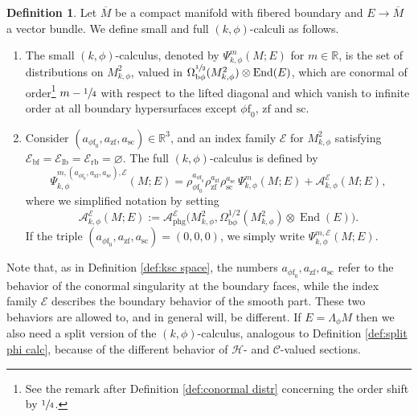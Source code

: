 \documentclass[11pt]{article}
\numberwithin{equation}{section}
\newcommand{\bphi}{{\bb\phi}}
\theoremstyle{plain}
\theoremstyle{definition}
\newtheorem{defn}[Th]{Definition}
\newcommand{\R}{{\mathbb{R}}}
\newcommand\calA{{\mathcal A}}
\newcommand\calE{{\mathcal E}}
\newcommand {\phg}{{\mathrm{phg}}}
\newcommand{\phif}{{\phi\mathrm{f}}}
\newcommand{\lf}{{\mathrm{lb}}}
\newcommand{\rf}{{\mathrm{rb}}}
\newcommand{\bb}{{\mathrm{b}}}
\newcommand{\bbf}{{\mathrm{bf}}}
\newcommand{\ssc}{{\mathrm{sc}}}
\newcommand{\zf}{{\mathrm{zf}}}
\DeclareMathOperator{\End}{End}
\newcommand{\Mbar}{{\overline{M}}}\let\M\Mbar
\begin{document}
\begin{defn}\label{def:psi k phi}
Let $\Mbar$ be a compact manifold with fibered boundary and $E\to\Mbar$ a vector bundle.
We define small and full $(k,\phi)$-calculi as follows.

\begin{enumerate}
\item
The small $(k,\phi)$-calculus, denoted by $\Psi_{k,\phi}^m(M;E)$
for $m\in\R$, is the set of distributions on $M^2_{k,\phi}$, valued in
$\Omega^{\sfrac12}_{\bphi}(M^{2}_{k, \phi}) \otimes \End(E)$,
which are conormal of order\footnote{See the remark after Definition \ref{def:conormal distr} concerning the order shift by $\sfrac14$.}
$m-\sfrac14$ with respect to the lifted diagonal
and which vanish to infinite order at all boundary hypersurfaces except $\phif_0$, $\zf$ and $\ssc$.

\item
Consider $(a_{\phif_0},a_{\zf},a_{\ssc}) \in \mathbb{R}^{3}$,
and an index family $\mathcal{E}$ for $M^{2}_{k, \phi}$ satisfying
$ \calE_{\bbf}=\calE_{\lf}=\calE_{\rf}=\varnothing$. The full $(k,\phi)$-calculus is defined by
\begin{equation}
\Psi_{k,\phi}^{m,(a_{\phif_0}, a_\zf,a_\ssc),\calE}(M;E) =
\rho_{\phif_0}^{a_{\phif_0}}\rho_\zf^{a_\zf}\rho_\ssc^{a_\ssc}\,\Psi_{k,\phi}^m(M;E) + \calA^{\calE}_{k,\phi}(M;E),
\end{equation}
where we simplified notation by setting
\begin{equation*}
\calA^{\calE}_{k,\phi}(M;E):= \calA_{\phg}^\calE \bigl(M^{2}_{k, \phi},
\Omega^{1/2}_{\bphi} (M^{2}_{k, \phi})
\otimes \End(E)\bigr).
\end{equation*}
If the triple $(a_{\phif_0}, a_\zf,a_\ssc) = (0,0,0)$, we simply write $\Psi_{k,\phi}^{m,\calE}(M;E)$.
\end{enumerate}
\end{defn}

Note that, as in Definition \ref{def:ksc space}, the numbers $a_{\phif_0}, a_\zf,a_\ssc$ refer to the behavior of the
conormal singularity at the boundary faces, while the index family $\calE$ describes the boundary behavior
of the smooth part. These two behaviors are allowed to, and in general will, be different.
If $E=\Lambda_\phi M$ then
we also need a split version of the $(k,\phi)$-calculus, analogous to Definition \ref{def:split phi calc},
because of the different behavior of $\mathscr{H}$\nobreakdash- and $\mathscr{C}$-valued sections.
\end{document}
